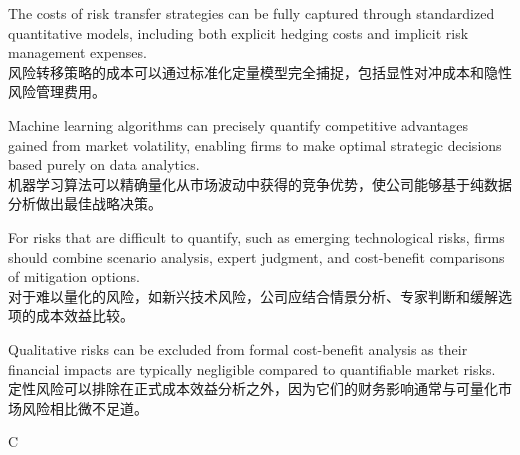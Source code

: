 \documentclass{article}
\begin{document}
    \begin{choices}
    \item The costs of risk transfer strategies can be fully captured through standardized quantitative models, including both explicit hedging costs and implicit risk management expenses. \\
    风险转移策略的成本可以通过标准化定量模型完全捕捉，包括显性对冲成本和隐性风险管理费用。
    
    \item Machine learning algorithms can precisely quantify competitive advantages gained from market volatility, enabling firms to make optimal strategic decisions based purely on data analytics. \\
    机器学习算法可以精确量化从市场波动中获得的竞争优势，使公司能够基于纯数据分析做出最佳战略决策。
    \item For risks that are difficult to quantify, such as emerging technological risks, firms should combine scenario analysis, expert judgment, and cost-benefit comparisons of mitigation options. \\
    对于难以量化的风险，如新兴技术风险，公司应结合情景分析、专家判断和缓解选项的成本效益比较。
    
    \item Qualitative risks can be excluded from formal cost-benefit analysis as their financial impacts are typically negligible compared to quantifiable market risks. \\
    定性风险可以排除在正式成本效益分析之外，因为它们的财务影响通常与可量化市场风险相比微不足道。
    \end{choices}
    
    \begin{correctanswer}
    C
    \end{correctanswer}
    
\end{document}
